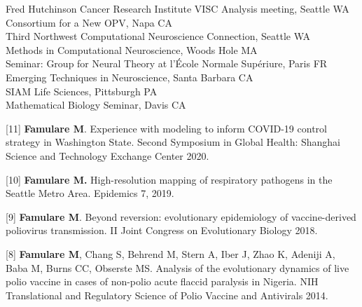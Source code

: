 \documentclass{article}
\begin{document}
\begin{llist}
	{Fred Hutchinson Cancer Research Institute VISC Analysis meeting, Seattle WA} \\
	{Consortium for a New OPV, Napa CA}  \\
	{Third Northwest Computational Neuroscience Connection, Seattle WA}  \\ %
    {Methods in Computational Neuroscience, Woods Hole MA} \\  %
    {Seminar: Group for Neural Theory at {l'\'{E}cole Normale Sup\'{e}riure}, Paris FR} \\
	{Emerging Techniques in Neuroscience, Santa Barbara CA}  \\ %
    {SIAM Life Sciences, Pittsburgh PA} \\ %
    {Mathematical Biology Seminar, Davis CA}  %
    



 \vspace{4pt}

\begin{items}
	
	\item[{[11]}] \textbf{Famulare M}. 
	Experience with modeling to inform COVID-19 control strategy in Washington State. Second Symposium in Global Health: Shanghai Science and Technology Exchange Center 2020.

	\item[{[10]}] \textbf{Famulare M.} High-resolution mapping of respiratory pathogens in the Seattle Metro Area. Epidemics 7, 2019. 	
	
	\item[{[9]}] \textbf{Famulare M}. Beyond reversion: evolutionary epidemiology of vaccine-derived poliovirus transmission. II Joint Congress on Evolutionary Biology 2018.
	
	\item[{[8]}] \textbf{Famulare M}, Chang S, Behrend M, Stern A, Iber J, Zhao K, Adeniji A, Baba M, Burns CC, Obserste MS. Analysis of the evolutionary dynamics of live polio vaccine in cases of non-polio acute flaccid paralysis in Nigeria. NIH Translational and Regulatory Science of Polio Vaccine and Antivirals 2014. 
	

\end{items}
\end{llist}
\end{document}
